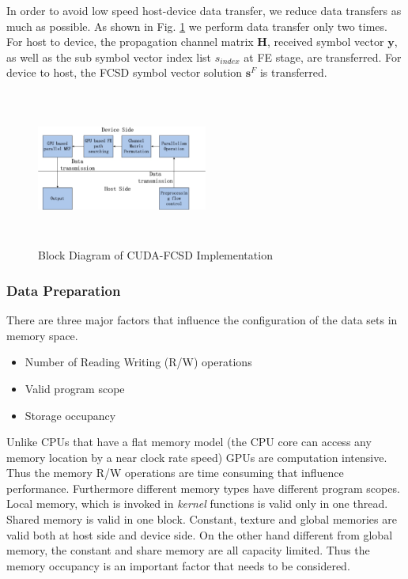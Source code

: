 \documentclass[letterpaper, 10pt, conference,twoside]{ieeeconf}
\begin{document}
In order to avoid low speed host-device data transfer, we reduce data transfers as much as possible. As shown in Fig. \ref{block diagram} we perform data transfer only two times. For host to device, the propagation channel matrix $\mathbf{H}$, received symbol vector $\mathbf{y}$, as well as the sub symbol vector index list $\mathit{s_{index}}$ at FE stage, are transferred. For device to host, the FCSD symbol vector solution $\mathbf{s}^{F}$ is transferred.
\begin{figure}[htb]
\centering
\includegraphics[width=0.5\textwidth, height=5.1cm]{CUDA_FCSD_block_diagram.eps}
\caption{Block Diagram of CUDA-FCSD Implementation}
\label{block diagram}
\end{figure}
\subsubsection{Data Preparation}\label{data preparation}
There are three major factors that influence the configuration of the data sets in memory space.
\begin{itemize}
\item Number of Reading Writing (R/W) operations
\item Valid program scope
\item Storage occupancy
\end{itemize}

Unlike CPUs that have a flat memory model (the CPU core can access any memory location by a near clock rate speed) GPUs are computation intensive. Thus the memory R/W operations are time consuming that influence performance. Furthermore different memory types have different program scopes. Local memory, which is invoked in \textit{kernel} functions is valid only in one thread. Shared memory is valid in one block. Constant, texture and global memories are valid both at host side and device side. On the other hand different from global memory, the constant and share memory are all capacity limited. Thus the memory occupancy is an important factor that needs to be considered.
 
\end{document}
